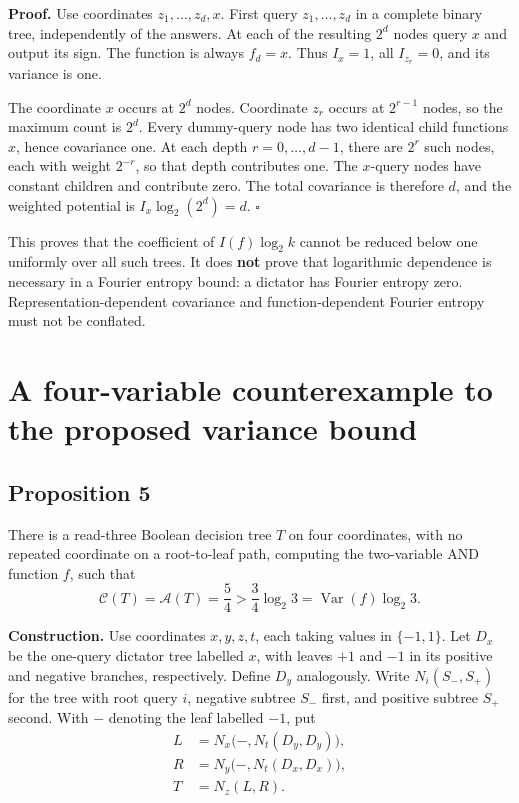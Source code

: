 \documentclass[
  american,
  11pt,
]{article}
\begin{document}
\textbf{Proof.} Use coordinates \(z_1,\ldots,z_d,x\). First query
\(z_1,\ldots,z_d\) in a complete binary tree, independently of the
answers. At each of the resulting \(2^d\) nodes query \(x\) and output
its sign. The function is always \(f_d=x\). Thus \(I_x=1\), all
\(I_{z_r}=0\), and its variance is one.

The coordinate \(x\) occurs at \(2^d\) nodes. Coordinate \(z_r\) occurs
at \(2^{r-1}\) nodes, so the maximum count is \(2^d\). Every dummy-query
node has two identical child functions \(x\), hence covariance one. At
each depth \(r=0,\ldots,d-1\), there are \(2^r\) such nodes, each with
weight \(2^{-r}\), so that depth contributes one. The \(x\)-query nodes
have constant children and contribute zero. The total covariance is
therefore \(d\), and the weighted potential is \(I_x\log_2(2^d)=d\).
\(\square\)

This proves that the coefficient of \(I(f)\log_2k\) cannot be reduced
below one uniformly over all such trees. It does \textbf{not} prove that
logarithmic dependence is necessary in a Fourier entropy bound: a
dictator has Fourier entropy zero. Representation-dependent covariance
and function-dependent Fourier entropy must not be conflated.

\section{A four-variable counterexample to the proposed variance
bound}\label{a-four-variable-counterexample-to-the-proposed-variance-bound}

\subsection*{Proposition 5}\label{proposition-5}

There is a read-three Boolean decision tree \(T\) on four coordinates,
with no repeated coordinate on a root-to-leaf path, computing the
two-variable AND function \(f\), such that \[
\mathcal C(T)=\mathcal A(T)=\frac54
>\frac34\log_2 3
=\operatorname{Var}(f)\log_2 3.
\tag{13}
\]

\textbf{Construction.} Use coordinates \(x,y,z,t\), each taking values
in \(\{-1,1\}\). Let \(D_x\) be the one-query dictator tree labelled
\(x\), with leaves \(+1\) and \(-1\) in its positive and negative
branches, respectively. Define \(D_y\) analogously. Write
\(N_i(S_-,S_+)\) for the tree with root query \(i\), negative subtree
\(S_-\) first, and positive subtree \(S_+\) second. With \(-\) denoting
the leaf labelled \(-1\), put \[
\begin{aligned}
L&=N_x\bigl(-,N_t(D_y,D_y)\bigr),\\
R&=N_y\bigl(-,N_t(D_x,D_x)\bigr),\\
T&=N_z(L,R).
\end{aligned}
\tag{14}
\]
\end{document}
